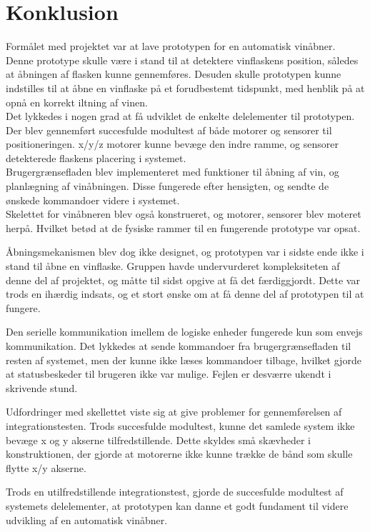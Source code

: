 \section{Konklusion}
Formålet med projektet var at lave prototypen for en automatisk vinåbner. Denne prototype skulle være i stand til at detektere vinflaskens position, således at
åbningen af flasken kunne gennemføres. Desuden skulle prototypen kunne indstilles til at åbne en vinflaske på et forudbestemt tidspunkt, med henblik på at 
opnå en korrekt iltning af vinen.\\

Det lykkedes i nogen grad at få udviklet de enkelte delelementer til prototypen. Der blev gennemført succesfulde modultest af både motorer og sensorer til 
positioneringen. x/y/z motorer kunne bevæge den indre ramme, og sensorer detekterede flaskens placering i systemet.\\

Brugergrænsefladen blev implementeret med funktioner til åbning af vin, og planlægning af vinåbningen. Disse fungerede efter hensigten, og sendte de ønskede
kommandoer videre i systemet.\\

Skelettet for vinåbneren blev også konstrueret, og motorer, sensorer blev moteret herpå. Hvilket betød at de fysiske rammer til en fungerende prototype var opsat.

Åbningsmekanismen blev dog ikke designet, og prototypen var i sidste ende ikke i stand til åbne en vinflaske. Gruppen havde undervurderet kompleksiteten af denne
del af projektet, og måtte til sidst opgive at få det færdiggjordt. Dette var trods en ihærdig indsats, og et stort ønske om at få denne del af prototypen til
at fungere.

Den serielle kommunikation imellem de logiske enheder fungerede kun som envejs kommunikation. Det lykkedes at sende kommandoer fra brugergrænsefladen til
resten af systemet, men der kunne ikke læses kommandoer tilbage, hvilket gjorde at statusbeskeder til brugeren ikke var mulige. Fejlen er desværre ukendt i
skrivende stund.

Udfordringer med skellettet viste sig at give problemer for gennemførelsen af integrationstesten. Trods succesfulde modultest, kunne det samlede system ikke
bevæge x og y akserne tilfredstillende. Dette skyldes små skævheder i konstruktionen, der gjorde at motorerne ikke kunne trække de bånd som skulle flytte x/y
akserne.       

Trods en utilfredstillende integrationstest, gjorde de succesfulde modultest af systemets delelementer, at prototypen kan danne et godt fundament til videre 
udvikling af en automatisk vinåbner.